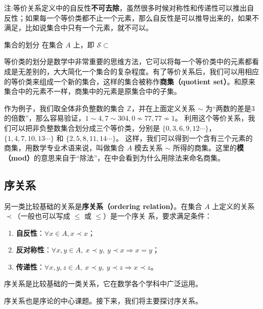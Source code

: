 注:等价关系定义中的自反性\textbf{不可去除}，虽然很多时候对称性和传递性可以推出自反性；如果每一个等价类都不止一个元素，那么自反性是可以推导出来的，如果不满足，比如说集合中只有一个元素，就不可以。

\begin{definition}{集合的划分}
在集合 $A$ 上，即 $\mathcal{S} \subset $
\end{definition}


等价类的划分是数学中非常重要的思维方法，它可以将每一个等价类中的元素都看成是无差别的，大大简化一个集合的复杂程度。有了等价关系后，我们可以用相应的等价类来组成一个新的集合，这样的集合被称作\textbf{商集（quotient set）}。和原来集合中的元素不一样，商集中的元素是原集合中的子集。

作为例子，我们取全体非负整数的集合 $\mathbb{Z}$，并在上面定义关系 $\sim$ 为“两数的差是3的倍数”，那么容易验证，$1\sim4, 7\sim304, 0\not\sim 77, 77\not\sim 1$。 利用这个等价关系，我们可以把非负整数集合划分成三个等价类，分别是 $\{0, 3, 6, 9, 12\cdots \}$，$\{1, 4, 7, 10, 13\cdots\}$ 和 $\{2, 5, 8, 11, 14\cdots\}$。 这样，我们可以得到一个含有三个元素的商集，用数学专业术语来说，叫做集合 $A$ 模去关系 $\sim$ 所得的商集。这里的\textbf{模（mod）}的意思来自于“除法”，在中会看到为什么用除法来命名商集。

\subsection{序关系}\label{sub_Relat_2}

另一类比较基础的关系是\textbf{序关系（ordering relation）}。在集合 $A$ 上定义的关系 $\prec$（一般也可以写成 $\leq$ 或 $\leqslant$）是一个序关
系，要求满足条件：
\begin{enumerate}
\item \textbf{自反性}：$\forall x\in A,x\prec x$；
\item \textbf{反对称性}：$\forall x,y\in A,\ x\prec y,\ y\prec x \Rightarrow x = y $；
\item \textbf{传递性}：$\forall x,y,z\in A,\ x\prec y,\ y\prec z \Rightarrow x\prec z $。
\end{enumerate}

序关系是比较基础的一类关系，它在数学各个学科中广泛运用。

序关系也是序论的中心课题。接下来，我们将主要探讨序关系。
